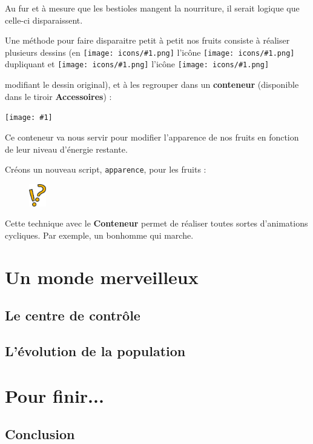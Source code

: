 \documentclass[a4paper,12pt]{book}
\newcommand{\capture}[1]
{
\begin{center}
	\texttt{[image: \#1]}
\end{center}
}
\newcommand{\code}[1]{\texttt{#1}}
\newcommand{\important}[1]{\textbf{#1}}
\newcommand{\inserticon}[1]
{
\texttt{[image: icons/\#1.png]}
}
\newcommand{\icon}[2][]
{
\ifthenelse {\equal{#1} {}} {\inserticon{#2}} {l'icône \inserticon{#2} \important{#1}}
}
\newcommand{\astuce}[1]
{
\begin{framed}
\begin{figure}
	\vspace{-15pt}
	\includegraphics[width=2.0em]{astuce.png}
\end{figure}
#1
\end{framed}
}
\let\myMargin\marginpar
\renewcommand{\marginpar}[1]{\myMargin{{\scriptsize \sffamily #1}}}
\begin{document}
Au fur et à mesure que les bestioles mangent la nourriture, il serait logique
que celle-ci disparaissent.

Une méthode pour faire disparaitre petit à petit nos fruits consiste à réaliser
plusieurs dessins (en \icon{dupliquer} dupliquant et \icon{redessiner}
modifiant le dessin original), et à les regrouper dans un \important{conteneur}
(disponible dans le tiroir \important{Accessoires}) :

\capture{59}

Ce conteneur va nous servir pour modifier l'apparence de nos fruits en fonction de leur niveau d'énergie restante.

Créons un nouveau script, \code{apparence}, pour les fruits :

\astuce{Cette technique avec le \important{Conteneur} permet de réaliser toutes
sortes d'animations cycliques. Par exemple, un bonhomme qui marche.}


\chapter{Un monde merveilleux}

\section{Le centre de contrôle}

\section{L'évolution de la population}

\chapter{Pour finir...}

\section{Conclusion}
\end{document}
